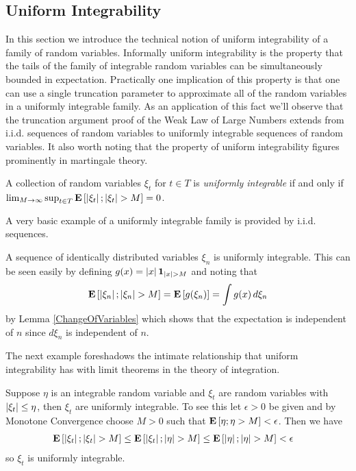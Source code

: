 \subsection{Uniform Integrability}

In this section we introduce the technical notion of uniform
integrability of a family of random variables.  Informally uniform
integrability is the property that the tails of the family of
integrable random
variables can be simultaneously bounded in expectation.  Practically
one implication of this property is that one can use a single
truncation parameter to approximate all of the random variables in a
uniformly integrable family.  As an application of this fact we'll
observe that the truncation argument proof of the Weak Law of Large
Numbers extends from i.i.d. sequences of random variables to uniformly
integrable sequences of random variables.  It also worth noting that
the property of uniform integrability figures prominently in
martingale theory.

\begin{defn}A collection of random variables $\xi_t$ for $t \in T$ is
  \emph{uniformly integrable} if and only if $\lim_{M \to \infty}
  \sup_{t \in T} \textbf{E}\left[\left \vert \xi_t \right \vert ; \left \vert \xi_t \right \vert > M\right] = 0$.
\end{defn}

A very basic example of a uniformly integrable family is provided by
i.i.d. sequences.
\begin{examp}A sequence of identically distributed variables $\xi_n$ is
  uniformly integrable.  This can be seen easily by defining $g(x) =
  \left \vert x \right \vert\textbf{1}_{\left \vert x \right \vert>M}$ and noting that 
\begin{align*}
\textbf{E}\left[\left \vert \xi_n \right \vert ; \left \vert \xi_n \right \vert > M\right] = \textbf{E}\left[g(\xi_n)\right] =
\int g(x) \, d\xi_n
\end{align*}
by Lemma \ref{ChangeOfVariables} which shows that the expectation is
independent of $n$ since $d\xi_n$ is independent of $n$.
\end{examp}

The next example foreshadows the intimate relationship that uniform
integrability has with limit theorems in the theory of integration.
\begin{examp}\label{DominatedImpliesUniformlyIntegrable}Suppose $\eta$ is an integrable random variable and $\xi_t$ are random variables with $\left \vert \xi_t \right \vert
  \leq \eta$, then $\xi_t$ are uniformly integrable.  To see this let
  $\epsilon >0$ be given and by Monotone Convergence choose $M > 0$
  such that $\textbf{E}\left[\eta; \eta > M\right] < \epsilon$.  Then we have
\begin{align*}
\textbf{E}\left[\left \vert \xi_t \right \vert; \left \vert \xi_t \right \vert>M\right] &\leq
\textbf{E}\left[\left \vert \xi_t \right \vert; \left \vert \eta \right \vert>M\right] \leq \textbf{E}\left[\left \vert \eta \right \vert;
  \left \vert \eta \right \vert>M\right] < \epsilon
\end{align*}
so $\xi_t$ is uniformly integrable.
\end{examp}

